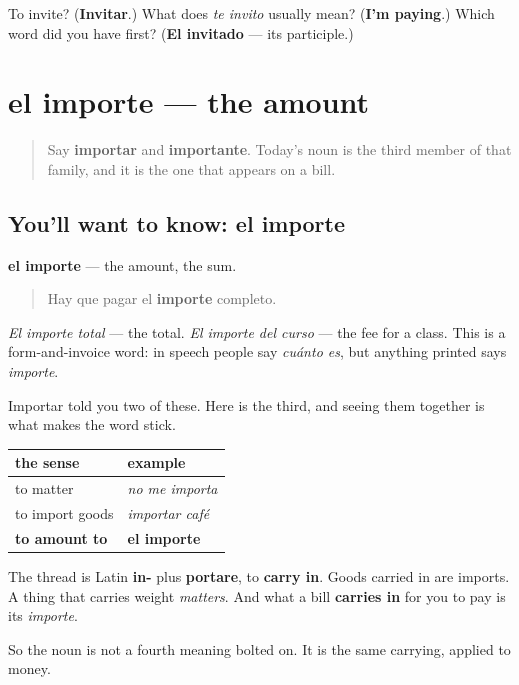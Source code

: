 \begin{tcolorbox}[breakable,colback=teal!4,colframe=teal!35!black,title={Before you move on}]
To invite? (\textbf{Invitar}.) What does \emph{te invito} usually mean? (\textbf{I'm paying}.) Which word did you have first? (\textbf{El invitado} — its participle.)
\end{tcolorbox}
\section[el importe]{el importe — the amount}

\label{lesson:ES-C474-importe}



\begin{quote}
Say \textbf{importar} and \textbf{importante}. Today's noun is the third member of that family, and it is the one that appears on a bill.
\end{quote}

\subsection*{You'll want to know: el importe}
\textbf{el importe} — the amount, the sum.

\begin{quote}
Hay que pagar el \textbf{importe} completo.
\end{quote}

\emph{El importe total} — the total. \emph{El importe del curso} — the fee for a class. This is a form-and-invoice word: in speech people say \emph{cuánto es}, but anything printed says \emph{importe}.

\begin{grammarlens}[title={Grammar Lens: one verb, three jobs}]
Importar told you two of these. Here is the third, and seeing them together is what makes the word stick.

\noindent
\begin{tabularx}{\linewidth}{@{}>{\raggedright\arraybackslash}X>{\raggedright\arraybackslash}X@{}}
\toprule
\textbf{the sense} & \textbf{example} \\
\midrule
to matter & \emph{no me importa} \\
to import goods & \emph{importar café} \\
\textbf{to amount to} & \textbf{el importe} \\
\bottomrule
\end{tabularx}

The thread is Latin \textbf{in-} plus \textbf{portare}, to \textbf{carry in}. Goods carried in are imports. A thing that carries weight \emph{matters}. And what a bill \textbf{carries in} for you to pay is its \emph{importe}.

So the noun is not a fourth meaning bolted on. It is the same carrying, applied to money.
\end{grammarlens}


